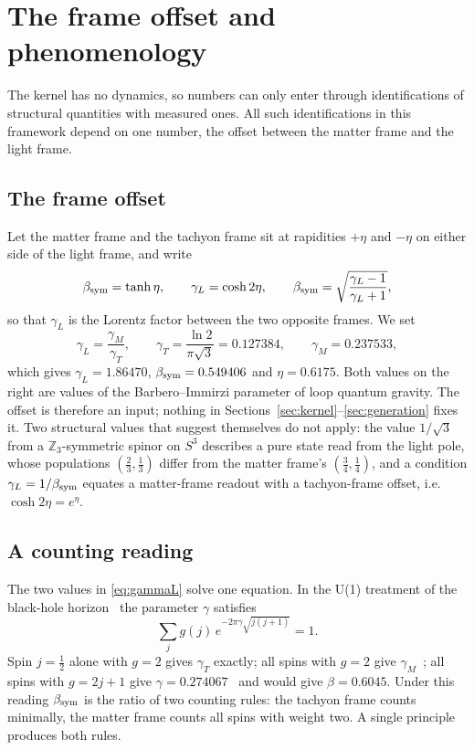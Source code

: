 \section{The frame offset and phenomenology}\label{sec:pheno}

The kernel has no dynamics, so numbers can only enter through identifications of structural quantities with measured ones.  All such
identifications in this framework depend on one number, the offset between the matter frame and the light frame.

\subsection{The frame offset}

Let the matter frame and the tachyon frame sit at rapidities \(+\eta\) and \(-\eta\) on either side of the light frame, and write
\begin{equation}\label{eq:beta}
\beta_{\rm sym}=\tanh\eta,\qquad \gamma_L=\cosh2\eta,\qquad \beta_{\rm sym}=\sqrt{\frac{\gamma_L-1}{\gamma_L+1}} ,
\end{equation}
so that \(\gamma_L\) is the Lorentz factor between the two opposite frames.  We set
\begin{equation}\label{eq:gammaL}
\gamma_L=\frac{\gamma_M}{\gamma_T},\qquad \gamma_T=\frac{\ln2}{\pi\sqrt3}=0.127384,\qquad \gamma_M=0.237533,
\end{equation}
which gives \(\gamma_L=1.86470\), \(\beta_{\rm sym}=0.549406\) and \(\eta=0.6175\).  Both values on the right are values of the Barbero--Immirzi
parameter of loop quantum gravity.  The offset is therefore an input; nothing in Sections~\ref{sec:kernel}--\ref{sec:generation} fixes it.
Two structural values that suggest themselves do not apply: the value \(1/\sqrt3\) from a \(\mathbb Z_3\)-symmetric spinor on \(S^3\) describes a pure
state read from the light pole, whose populations \((\tfrac23,\tfrac13)\) differ from the matter frame's \((\tfrac34,\tfrac14)\), and a condition
\(\gamma_L=1/\beta_{\rm sym}\) equates a matter-frame readout with a tachyon-frame offset, i.e.\ \(\cosh2\eta=e^\eta\).

\subsection{A counting reading}

The two values in \eqref{eq:gammaL} solve one equation.  In the U(1) treatment of the black-hole horizon~\cite{abck,domagala,meissner} the
parameter \(\gamma\) satisfies
\begin{equation}\label{eq:counting}
\sum_j g(j)\,e^{-2\pi\gamma\sqrt{j(j+1)}}=1 .
\end{equation}
Spin \(j=\tfrac12\) alone with \(g=2\) gives \(\gamma_T\) exactly; all spins with \(g=2\) give \(\gamma_M\)~\cite{meissner}; all spins with \(g=2j+1\) give
\(\gamma=0.274067\)~\cite{ghosh} and would give \(\beta=0.6045\).  Under this reading \(\beta_{\rm sym}\) is the ratio of two counting rules: the
tachyon frame counts minimally, the matter frame counts all spins with weight two.  A single principle produces both rules.

